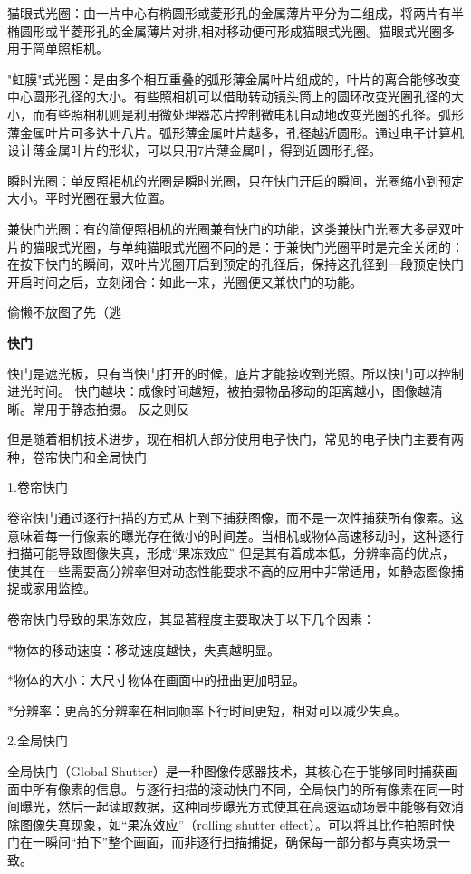 猫眼式光圈：由一片中心有椭圆形或菱形孔的金属薄片平分为二组成，将两片有半椭圆形或半菱形孔的金属薄片对排,相对移动便可形成猫眼式光圈。猫眼式光圈多用于简单照相机。

"虹膜"式光圈：是由多个相互重叠的弧形薄金属叶片组成的，叶片的离合能够改变中心圆形孔径的大小。有些照相机可以借助转动镜头筒上的圆环改变光圈孔径的大小，而有些照相机则是利用微处理器芯片控制微电机自动地改变光圈的孔径。弧形薄金属叶片可多达十八片。弧形薄金属叶片越多，孔径越近圆形。通过电子计算机设计薄金属叶片的形状，可以只用7片薄金属叶，得到近圆形孔径。

瞬时光圈：单反照相机的光圈是瞬时光圈，只在快门开启的瞬间，光圈缩小到预定大小。平时光圈在最大位置。

兼快门光圈：有的简便照相机的光圈兼有快门的功能，这类兼快门光圈大多是双叶片的猫眼式光圈，与单纯猫眼式光圈不同的是：于兼快门光圈平时是完全关闭的：在按下快门的瞬间，双叶片光圈开启到预定的孔径后，保持这孔径到一段预定快门开启时间之后，立刻闭合：如此一来，光圈便又兼快门的功能。

偷懒不放图了先（逃

\textbf{快门}

快门是遮光板，只有当快门打开的时候，底片才能接收到光照。所以快门可以控制进光时间。
快门越块：成像时间越短，被拍摄物品移动的距离越小，图像越清晰。常用于静态拍摄。
反之则反

但是随着相机技术进步，现在相机大部分使用电子快门，常见的电子快门主要有两种，卷帘快门和全局快门

1.卷帘快门

卷帘快门通过逐行扫描的方式从上到下捕获图像，而不是一次性捕获所有像素。这意味着每一行像素的曝光存在微小的时间差。当相机或物体高速移动时，这种逐行扫描可能导致图像失真，形成“果冻效应”
但是其有着成本低，分辨率高的优点，使其在一些需要高分辨率但对动态性能要求不高的应用中非常适用，如静态图像捕捉或家用监控。

卷帘快门导致的果冻效应，其显著程度主要取决于以下几个因素：

*物体的移动速度：移动速度越快，失真越明显。

*物体的大小：大尺寸物体在画面中的扭曲更加明显。

*分辨率：更高的分辨率在相同帧率下行时间更短，相对可以减少失真。

2.全局快门

全局快门（Global Shutter）是一种图像传感器技术，其核心在于能够同时捕获画面中所有像素的信息。与逐行扫描的滚动快门不同，全局快门的所有像素在同一时间曝光，然后一起读取数据，这种同步曝光方式使其在高速运动场景中能够有效消除图像失真现象，如“果冻效应”（rolling shutter effect）。可以将其比作拍照时快门在一瞬间“拍下”整个画面，而非逐行扫描捕捉，确保每一部分都与真实场景一致。

